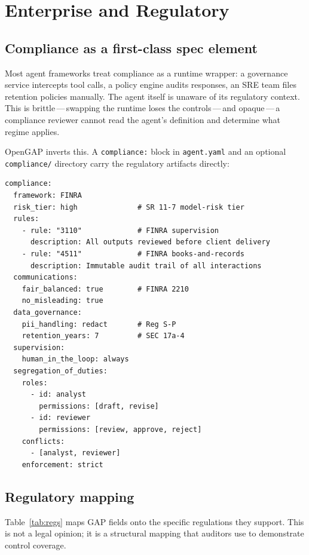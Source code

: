 \documentclass[11pt,a4paper]{article}
\begin{document}
\section{Enterprise and Regulatory}\label{sec:compliance}

\subsection{Compliance as a first-class spec element}

Most agent frameworks treat compliance as a runtime wrapper: a governance service
intercepts tool calls, a policy engine audits responses, an SRE team files retention
policies manually. The agent itself is unaware of its regulatory context. This is
brittle\,---\,swapping the runtime loses the controls\,---\,and opaque\,---\,a
compliance reviewer cannot read the agent's definition and determine what regime
applies.

OpenGAP inverts this. A \texttt{compliance:} block in \texttt{agent.yaml} and an
optional \texttt{compliance/} directory carry the regulatory artifacts directly:

\begin{lstlisting}[language=yamlex]
compliance:
  framework: FINRA
  risk_tier: high              # SR 11-7 model-risk tier
  rules:
    - rule: "3110"             # FINRA supervision
      description: All outputs reviewed before client delivery
    - rule: "4511"             # FINRA books-and-records
      description: Immutable audit trail of all interactions
  communications:
    fair_balanced: true        # FINRA 2210
    no_misleading: true
  data_governance:
    pii_handling: redact       # Reg S-P
    retention_years: 7         # SEC 17a-4
  supervision:
    human_in_the_loop: always
  segregation_of_duties:
    roles:
      - id: analyst
        permissions: [draft, revise]
      - id: reviewer
        permissions: [review, approve, reject]
    conflicts:
      - [analyst, reviewer]
    enforcement: strict
\end{lstlisting}

\subsection{Regulatory mapping}

Table~\ref{tab:regs} maps GAP fields onto the specific regulations they support. This
is not a legal opinion; it is a structural mapping that auditors use to demonstrate
control coverage.
\end{document}
